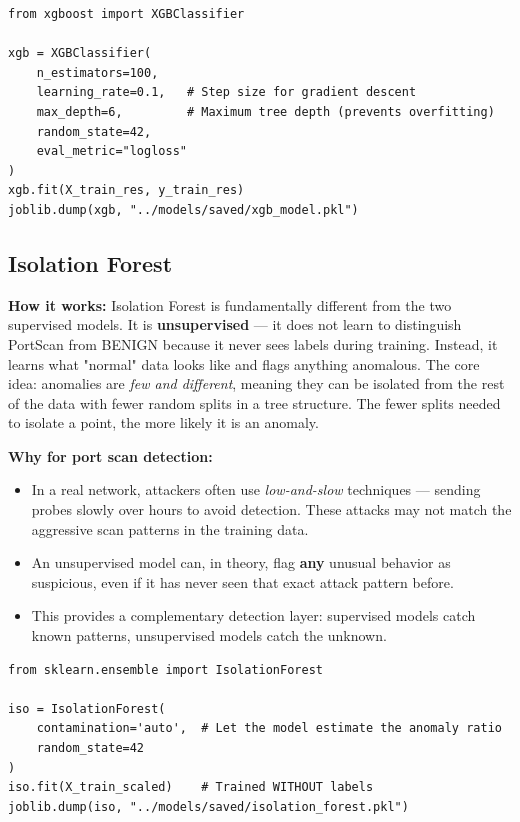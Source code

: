 \documentclass[12pt,a4paper]{report}
\begin{document}
\begin{lstlisting}[caption={XGBoost training}]
from xgboost import XGBClassifier

xgb = XGBClassifier(
    n_estimators=100,
    learning_rate=0.1,   # Step size for gradient descent
    max_depth=6,         # Maximum tree depth (prevents overfitting)
    random_state=42,
    eval_metric="logloss"
)
xgb.fit(X_train_res, y_train_res)
joblib.dump(xgb, "../models/saved/xgb_model.pkl")
\end{lstlisting}

\subsection{Isolation Forest}

\textbf{How it works:} Isolation Forest is fundamentally different from the two supervised models. It is \textbf{unsupervised} --- it does not learn to distinguish PortScan from BENIGN because it never sees labels during training. Instead, it learns what "normal" data looks like and flags anything anomalous. The core idea: anomalies are \textit{few and different}, meaning they can be isolated from the rest of the data with fewer random splits in a tree structure. The fewer splits needed to isolate a point, the more likely it is an anomaly.

\textbf{Why for port scan detection:}
\begin{itemize}
    \item In a real network, attackers often use \textit{low-and-slow} techniques --- sending probes slowly over hours to avoid detection. These attacks may not match the aggressive scan patterns in the training data.
    \item An unsupervised model can, in theory, flag \textbf{any} unusual behavior as suspicious, even if it has never seen that exact attack pattern before.
    \item This provides a complementary detection layer: supervised models catch known patterns, unsupervised models catch the unknown.
\end{itemize}

\begin{lstlisting}[caption={Isolation Forest training (unsupervised)}]
from sklearn.ensemble import IsolationForest

iso = IsolationForest(
    contamination='auto',  # Let the model estimate the anomaly ratio
    random_state=42
)
iso.fit(X_train_scaled)    # Trained WITHOUT labels
joblib.dump(iso, "../models/saved/isolation_forest.pkl")
\end{lstlisting}
\end{document}
